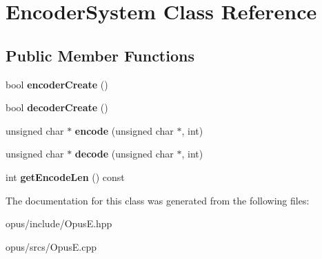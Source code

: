 \hypertarget{class_encoder_system}{}\section{Encoder\+System Class Reference}
\label{class_encoder_system}
\subsection*{Public Member Functions}
\begin{DoxyCompactItemize}
\item 
\mbox{\label{class_encoder_system_acc908bc5e4ceadea3fb7092abdc0a424}} 
bool {\bfseries encoder\+Create} ()
\item 
\mbox{\label{class_encoder_system_aa1cbc01eab04f54c459beccb25c04310}} 
bool {\bfseries decoder\+Create} ()
\item 
\mbox{\label{class_encoder_system_a6abd2746259b33188e29a3294c430cb8}} 
unsigned char $\ast$ {\bfseries encode} (unsigned char $\ast$, int)
\item 
\mbox{\label{class_encoder_system_a5682a2c9ebff333e35295a766bdaab2d}} 
unsigned char $\ast$ {\bfseries decode} (unsigned char $\ast$, int)
\item 
\mbox{\label{class_encoder_system_ab4ac3b5279f2a6abba4ea182dd4b2aa2}} 
int {\bfseries get\+Encode\+Len} () const
\end{DoxyCompactItemize}


The documentation for this class was generated from the following files\+:\begin{DoxyCompactItemize}
\item 
opus/include/Opus\+E.\+hpp\item 
opus/srcs/Opus\+E.\+cpp\end{DoxyCompactItemize}
